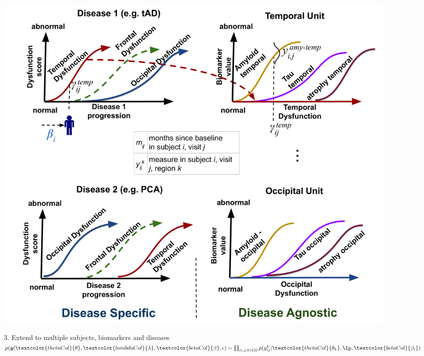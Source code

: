 \documentclass[portrait,a0,final,20pt]{a0poster}
\newcommand{\fnt}[1]{\LARGE{#1}}
\begin{document}
{\begin{multicols}{2}
\begin{figure}[H]
\begin{subfigure}{0.49\columnwidth}
  \end{subfigure}

 \includegraphics[width=\columnwidth,trim=0 0 0 00,clip]{disease_knowledge_transfer_poster.pdf}

 
  \fnt{3. Extend to multiple subjects, biomarkers and diseases}\\
 $ p(\boldsymbol{y}|\textcolor{thetaCol}{\theta}, \textcolor{lambdaCol}{\lambda}, \textcolor{betaCol}{\beta}, \epsilon) = \prod_{(i,j,k) \in \Omega} p(y_{ij}^k|\textcolor{thetaCol}{\theta_k}, \lp, \textcolor{betaCol}{\beta_{i}}) $
 \end{figure}


\columnbreak




\newcommand{\uu}{^{(u)}}
\newcommand{\um}{^{(u-1)}}

\newcommand{\algoFnt}[1]{\Large{#1}}





\end{multicols}}
\end{document}
